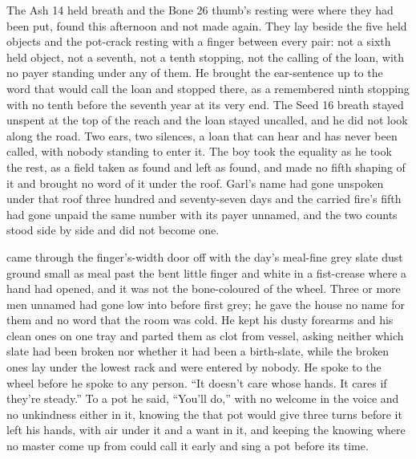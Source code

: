 The Ash 14 held breath and the Bone 26 thumb's resting were where they had been put, found this afternoon and not made again. They lay beside the five held objects and the pot-crack resting with a finger between every pair: not a sixth held object, not a seventh, not a tenth stopping, not the calling of the loan, with no payer standing under any of them. He brought the ear-sentence up to the word that would call the loan and stopped there, as a remembered ninth stopping with no tenth before the seventh year at its very end. The Seed 16 breath stayed unspent at the top of the reach and the loan stayed uncalled, and he did not look along the road. Two ears, two silences, a loan that can hear and has never been called, with nobody standing to enter it. The boy took the equality as he took the rest, as a field taken as found and left as found, and made no fifth shaping of it and brought no word of it under the roof. Garl's name had gone unspoken under that roof three hundred and seventy-seven days and the carried fire's fifth had gone unpaid the same number with its payer unnamed, and the two counts stood side by side and did not become one.

\scenebreak

 came through the finger's-width door off  with the day's meal-fine grey slate dust ground small as meal past the bent little finger and white in a fist-crease where a hand had opened, and it was not the bone-coloured  of the wheel. Three or more men unnamed had gone low into  before first grey; he gave the house no name for them and no word that the room was cold. He kept his dusty forearms and his clean ones on one tray and parted them as clot from vessel, asking neither which slate had been broken nor whether it had been a birth-slate, while the broken ones lay under the lowest rack and were entered by nobody. He spoke to the wheel before he spoke to any person. “It doesn't care whose hands. It cares if they're steady.” To a pot he said, “You'll do,” with no welcome in the voice and no unkindness either in it, knowing the  that pot would give three turns before it left his hands, with air under it and a want in it, and keeping the knowing where no master come up from  could call it early and sing a pot before its time.

